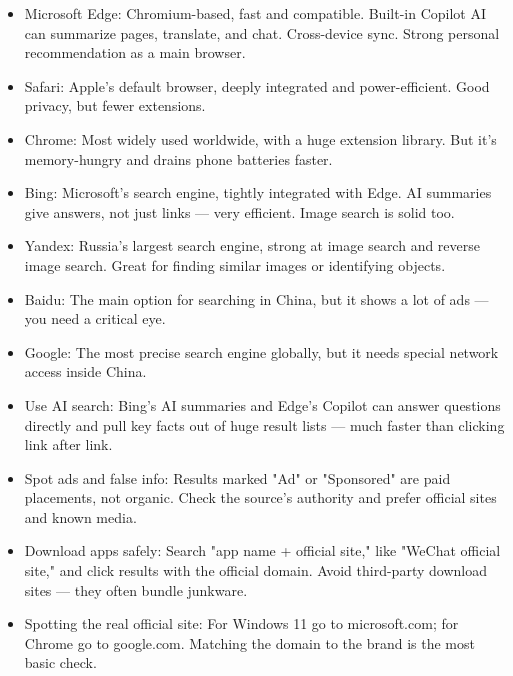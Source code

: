 \begin{itemize}
  \item Microsoft Edge: Chromium-based, fast and compatible. Built-in Copilot AI can summarize pages, translate, and chat. Cross-device sync. Strong personal recommendation as a main browser.
  \item Safari: Apple's default browser, deeply integrated and power-efficient. Good privacy, but fewer extensions.
  \item Chrome: Most widely used worldwide, with a huge extension library. But it's memory-hungry and drains phone batteries faster.
\end{itemize}


\begin{itemize}
  \item Bing: Microsoft's search engine, tightly integrated with Edge. AI summaries give answers, not just links — very efficient. Image search is solid too.
  \item Yandex: Russia's largest search engine, strong at image search and reverse image search. Great for finding similar images or identifying objects.
  \item Baidu: The main option for searching in China, but it shows a lot of ads — you need a critical eye.
  \item Google: The most precise search engine globally, but it needs special network access inside China.
\end{itemize}


\begin{itemize}
  \item Use AI search: Bing's AI summaries and Edge's Copilot can answer questions directly and pull key facts out of huge result lists — much faster than clicking link after link.
  \item Spot ads and false info: Results marked "Ad" or "Sponsored" are paid placements, not organic. Check the source's authority and prefer official sites and known media.
  \item Download apps safely: Search "app name + official site," like "WeChat official site," and click results with the official domain. Avoid third-party download sites — they often bundle junkware.
  \item Spotting the real official site: For Windows 11 go to microsoft.com; for Chrome go to google.com. Matching the domain to the brand is the most basic check.
\end{itemize}

